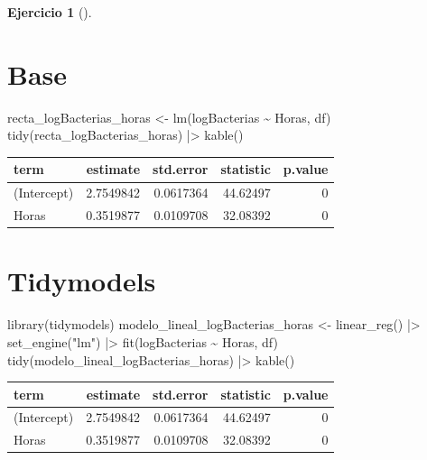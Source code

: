 \documentclass[
  a4paper,
]{scrreport}
\newenvironment{Shaded}{\begin{snugshade}}{\end{snugshade}}
\newcommand{\FunctionTok}[1]{\textcolor[rgb]{0.28,0.35,0.67}{#1}}
\newcommand{\NormalTok}[1]{\textcolor[rgb]{0.00,0.23,0.31}{#1}}
\newcommand{\OtherTok}[1]{\textcolor[rgb]{0.00,0.23,0.31}{#1}}
\newcommand{\SpecialCharTok}[1]{\textcolor[rgb]{0.37,0.37,0.37}{#1}}
\newcommand{\StringTok}[1]{\textcolor[rgb]{0.13,0.47,0.30}{#1}}
\theoremstyle{definition}
\newtheorem{exercise}{Ejercicio}[chapter]
\theoremstyle{remark}
\begin{document}
\begin{exercise}[]
\begin{enumerate}
\begin{tcolorbox}
  \section{Base}

\begin{Shaded}
\begin{Highlighting}[]
\NormalTok{recta\_logBacterias\_horas }\OtherTok{\textless{}{-}} \FunctionTok{lm}\NormalTok{(logBacterias }\SpecialCharTok{\textasciitilde{}}\NormalTok{ Horas, df) }
\FunctionTok{tidy}\NormalTok{(recta\_logBacterias\_horas) }\SpecialCharTok{|\textgreater{}} \FunctionTok{kable}\NormalTok{()}
\end{Highlighting}
\end{Shaded}

  \begin{longtable}[]{@{}lrrrr@{}}
  \toprule\noalign{}
  term & estimate & std.error & statistic & p.value \\
  \midrule\noalign{}
  \endhead
  \bottomrule\noalign{}
  \endlastfoot
  (Intercept) & 2.7549842 & 0.0617364 & 44.62497 & 0 \\
  Horas & 0.3519877 & 0.0109708 & 32.08392 & 0 \\
  \end{longtable}

  \section{Tidymodels}

\begin{Shaded}
\begin{Highlighting}[]
\FunctionTok{library}\NormalTok{(tidymodels)}
\NormalTok{modelo\_lineal\_logBacterias\_horas }\OtherTok{\textless{}{-}} \FunctionTok{linear\_reg}\NormalTok{() }\SpecialCharTok{|\textgreater{}}
  \FunctionTok{set\_engine}\NormalTok{(}\StringTok{"lm"}\NormalTok{) }\SpecialCharTok{|\textgreater{}} 
  \FunctionTok{fit}\NormalTok{(logBacterias }\SpecialCharTok{\textasciitilde{}}\NormalTok{ Horas, df)}
\FunctionTok{tidy}\NormalTok{(modelo\_lineal\_logBacterias\_horas) }\SpecialCharTok{|\textgreater{}} \FunctionTok{kable}\NormalTok{()}
\end{Highlighting}
\end{Shaded}

  \begin{longtable}[]{@{}lrrrr@{}}
  \toprule\noalign{}
  term & estimate & std.error & statistic & p.value \\
  \midrule\noalign{}
  \endhead
  \bottomrule\noalign{}
  \endlastfoot
  (Intercept) & 2.7549842 & 0.0617364 & 44.62497 & 0 \\
  Horas & 0.3519877 & 0.0109708 & 32.08392 & 0 \\
  \end{longtable}


\end{tcolorbox}
\end{enumerate}
\end{exercise}
\end{document}
